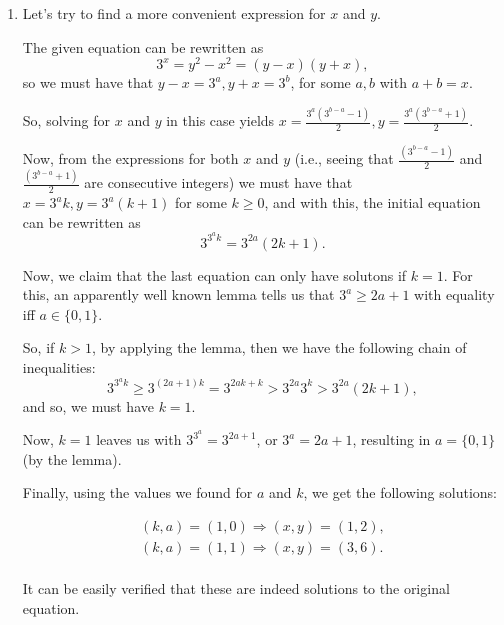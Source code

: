 \documentclass{article}
\begin{document}
\begin{enumerate}
\item Let's try to find a more convenient expression for $x$ and $y$.

The given equation can be rewritten as
$$
	3^x = y^2 - x^2 = (y - x)(y + x),
$$
so we must have that $ y - x = 3^a, y + x = 3^b$, for some $a, b$ with
$a + b = x.$

So, solving for $x$ and $y$ in this case yields
$x = \frac{3^a(3^{b - a} - 1)}{2}, y = \frac{3^a(3^{b - a} + 1)}{2}.$

Now, from the expressions for both $x$ and $y$ (i.e., seeing that
$\frac{(3^{b - a} - 1)}{2}$ and $\frac{(3^{b - a} + 1)}{2}$ are consecutive
integers) we must have that $x = 3^ak,y = 3^a(k + 1)$ for some $k \geq 0$, and
with this, the initial equation can be rewritten as
$$
	3^{3^ak} = 3^{2a}(2k + 1).
$$

Now, we claim that the last equation can only have solutons if $k = 1.$
For this, an apparently well known lemma tells us that $3^a \geq 2a + 1$ with
equality iff $a \in \{ 0, 1 \}$.

So, if $k > 1$, by applying the lemma, then we have the following chain
of inequalities:
$$
	3^{3^ak} \geq 3^{(2a + 1)k} = 3^{2ak + k} > 3^{2a} 3^k > 3^{2a}(2k + 1),
$$
and so, we must have $k = 1.$ 

Now, $k = 1$ leaves us with $3^{3^a} = 3^{2a + 1}$, or $3^a = 2a + 1$, resulting
in $a = \{ 0, 1 \}$ (by the lemma).

Finally, using the values we found for $a$ and $k$, we get the following solutions:

\begin{eqnarray*}
   (k, a) = (1, 0) \Rightarrow (x, y) = (1, 2),	\\
   (k, a) = (1, 1) \Rightarrow (x, y) = (3, 6). 	\\
\end{eqnarray*}

It can be easily verified that these are indeed solutions to the original equation.
\end{enumerate}
\end{document}
